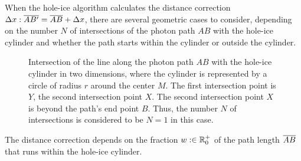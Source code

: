 When the hole-ice algorithm calculates the distance correction
\(\Delta x: \overline{AB'} = \overline{AB} + \Delta x\), there are several
geometric cases to consider, depending on the number \(N\) of
intersections of the photon path \(AB\) with the hole-ice cylinder and
whether the path starts within the cylinder or outside the cylinder.

\begin{figure}[htbp]
  \caption{Intersection of the line along the photon path $AB$ with the hole-ice cylinder in two dimensions, where the cylinder is represented by a circle of radius $r$ around the center $M$. The first intersection point is $Y$, the second intersection point $X$. The second intersection point $X$ is beyond the path's end point $B$. Thus, the number $N$ of intersections is considered to be $N=1$ in this case.}
  \label{fig:iefai4iV}
\end{figure}

The distance correction depends on the fraction \(w :\in \mathbb{R}^+_0\) of
the path length \(\overline{AB}\) that runs within the hole-ice cylinder.

